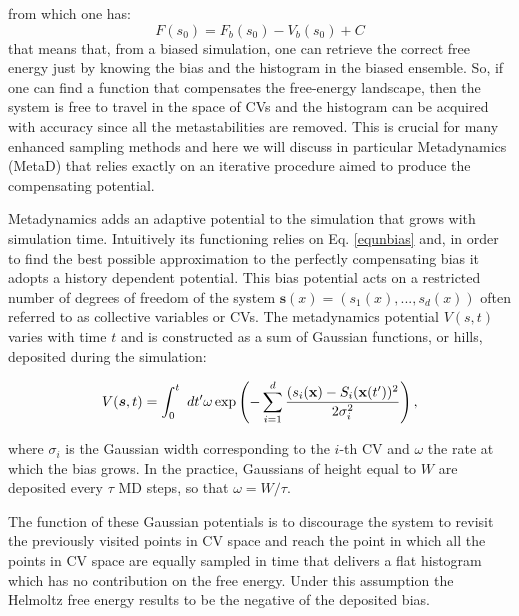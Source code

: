 \documentclass[10pt,fleqn,a4paper]{report}
\begin{document}
from which one has:
\begin{equation}
F(s_0)=F_b(s_0)-V_b(s_0)+C
\label{equnbias}
\end{equation}
that means that, from a biased simulation, one can retrieve the correct free energy just by knowing the bias and the histogram
in the biased ensemble. So, if one can find a function that compensates the free-energy landscape, then the system is free to travel in the space of CVs and the histogram can be acquired with accuracy since all the metastabilities are removed.
This is crucial for many enhanced sampling methods
and here we will discuss in particular Metadynamics (MetaD) \cite{metad} that relies exactly on an
iterative procedure aimed to produce the compensating potential.


Metadynamics adds an adaptive potential to the simulation that grows with simulation time.
Intuitively its functioning relies on Eq. \ref{equnbias} and, in order to find the best possible approximation to the perfectly compensating bias it adopts a history dependent potential. 
This bias potential acts on a restricted number of degrees of
freedom of the system $\bm{s}(x)=(s_1	(x),...,s_d(x))$ often referred to as collective variables or CVs.
The metadynamics potential $V(s,t)$ varies with time $t$ and is constructed 
as a sum of Gaussian functions, or hills, deposited during the simulation:

\begin{equation}
V(\bm{s},t)=\int_0^t\ dt^\prime \omega\exp\left(-\sum_{i=1}^{d} 
\frac{(s_i({\bf x})-S_i({\bf x}(t^\prime))^2}{2\sigma_i^2} \right),
\end{equation}

where $\sigma_i$ is the Gaussian width corresponding to the $i$-th CV
and $\omega$ the rate at which the bias grows.
In the practice, Gaussians of height equal to $W$ are deposited every $\tau$ MD steps,
so that $\omega=W / \tau$.

The function of these Gaussian potentials is to discourage the system to revisit the previously visited points in CV space and reach the point
in which all the points in CV space are equally sampled in time that delivers a flat histogram which has no contribution on the free energy. Under this assumption the Helmoltz free energy results to be  the negative of the deposited bias.
\end{document}
